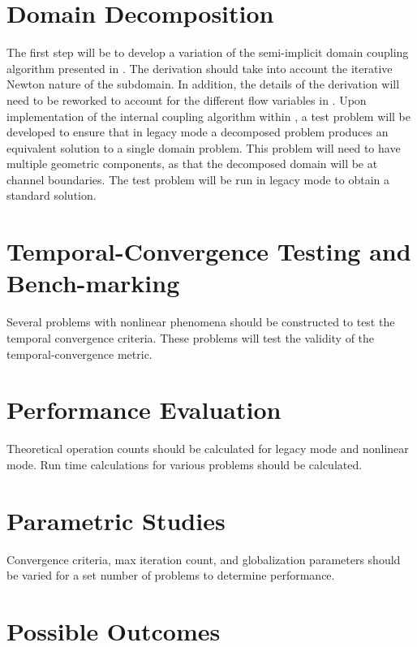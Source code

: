 \section{Domain Decomposition}
\label{sect:domain_coupling}
The first step will be to develop a variation of the semi-implicit domain coupling algorithm presented in .
The derivation should take into account the iterative Newton nature of the subdomain. 
In addition, the details of the derivation will need to be reworked to account for the different flow variables in \cobra{}.
Upon implementation of the internal coupling algorithm within \cobra{}, a test problem will be developed to ensure that in legacy mode a decomposed problem produces an equivalent solution to a single domain problem.
This problem will need to have multiple geometric components, as that the decomposed domain will be at channel boundaries.
The test problem will be run in legacy mode to obtain a standard solution.

\section{Temporal-Convergence Testing and Bench-marking}
\label{sect:proposal_temporal_testing}
Several problems with nonlinear phenomena should be constructed to test the temporal convergence criteria.
These problems will test the validity of the temporal-convergence metric.

\section{Performance Evaluation}
\label{sect:proposal_performance_evaluation}
Theoretical operation counts should be calculated for legacy mode and nonlinear mode.
Run time calculations for various problems should be calculated.


\section{Parametric Studies}
\label{sect:proposal_parametric_studies}
Convergence criteria, max iteration count, and globalization parameters should be varied for a set number of problems to determine performance.


\section{Possible Outcomes}
\label{sect:possible_outcomes}


